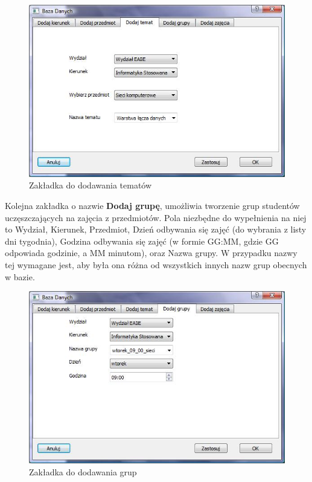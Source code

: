 \begin{figure}
\begin{center}
\includegraphics[scale=0.7]{dodaj_temat.jpg}
\caption{Zakładka do dodawania tematów}
\label{fig:dodajTemat}
\end{center}
\end{figure}

Kolejna zakładka o nazwie \textbf{Dodaj grupę}, umożliwia tworzenie grup studentów uczęszczających na zajęcia z przedmiotów. Pola niezbędne do wypełnienia na niej to Wydział, Kierunek, Przedmiot, Dzień odbywania się zajęć (do wybrania z listy dni tygodnia), Godzina odbywania się zajęć (w formie GG:MM, gdzie GG odpowiada godzinie, a MM minutom), oraz Nazwa grupy. W przypadku nazwy tej wymagane jest, aby była ona różna od wszystkich innych nazw grup obecnych w bazie.

\begin{figure}
\begin{center}
\includegraphics[scale=0.7]{dodaj_grupe.jpg}
\caption{Zakładka do dodawania grup}
\label{fig:dodajGrupe}
\end{center}
\end{figure}

